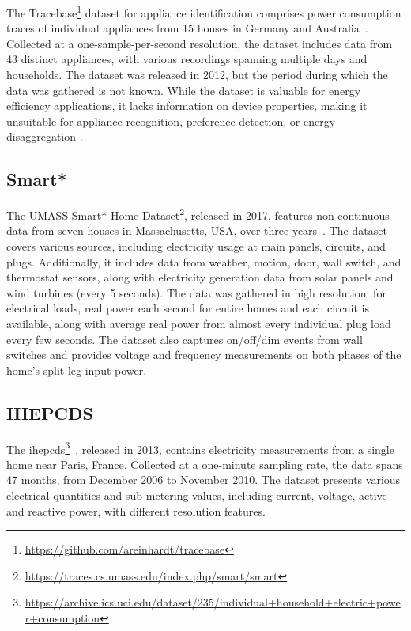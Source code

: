 The Tracebase\footnote{\url{https://github.com/areinhardt/tracebase}} dataset for appliance identification comprises power consumption traces of individual appliances from 15 houses in Germany and Australia~\parencite{reinhardtAccuracyApplianceIdentification2012}. Collected at a one-sample-per-second resolution, the dataset includes data from 43 distinct appliances, with various recordings spanning multiple days and households. The dataset was released in 2012, but the period during which the data was gathered is not known. While the dataset is valuable for energy efficiency applications, it lacks information on device properties, making it unsuitable for appliance recognition, preference detection, or energy disaggregation \parencite{himeurBuildingPowerConsumption2020}.

\subsection{Smart*}

The UMASS Smart* Home Dataset\footnote{\url{https://traces.cs.umass.edu/index.php/smart/smart}}, released in 2017, features non-continuous data from seven houses in Massachusetts, USA, over three years~\parencite{barkerSmartOpenData2012}. The dataset covers various sources, including electricity usage at main panels, circuits, and plugs. Additionally, it includes data from weather, motion, door, wall switch, and thermostat sensors, along with electricity generation data from solar panels and wind turbines (every 5 seconds). The data was gathered in high resolution: for electrical loads, real power each second for entire homes and each circuit is available, along with average real power from almost every individual plug load every few seconds. The dataset also captures on/off/dim events from wall switches and provides voltage and frequency measurements on both phases of the home’s split-leg input power.

\subsection{IHEPCDS}

The \acrlong{ihepcds}\footnote{\url{https://archive.ics.uci.edu/dataset/235/individual+household+electric+power+consumption}}~\parencite{georgeshebrailIndividualHouseholdElectric2006}, released in 2013, contains electricity measurements from a single home near Paris, France. Collected at a one-minute sampling rate, the data spans 47 months, from December 2006 to November 2010. The dataset presents various electrical quantities and sub-metering values, including current, voltage, active and reactive power, with different resolution features.

